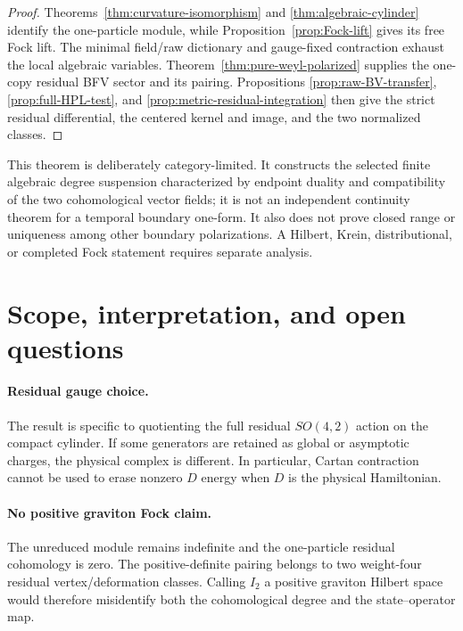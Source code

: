 \documentclass[11pt]{article}
\theoremstyle{definition}
\theoremstyle{remark}
\begin{document}
\begin{proof}
Theorems~\ref{thm:curvature-isomorphism} and
\ref{thm:algebraic-cylinder} identify the one-particle module, while
Proposition~\ref{prop:Fock-lift} gives its free Fock lift.  The minimal
field/raw dictionary and gauge-fixed contraction exhaust the local algebraic
variables.  Theorem~\ref{thm:pure-weyl-polarized} supplies the one-copy
residual BFV sector and its pairing.  Propositions
\ref{prop:raw-BV-transfer}, \ref{prop:full-HPL-test}, and
\ref{prop:metric-residual-integration} then give the strict residual
differential, the centered kernel and image, and the two normalized classes.
\end{proof}

This theorem is deliberately category-limited.  It constructs the selected
finite algebraic degree suspension characterized by endpoint duality and
compatibility of the two cohomological vector fields; it is not an
independent continuity theorem for a temporal boundary one-form.  It also
does not prove closed range or uniqueness among other boundary
polarizations.  A Hilbert, Krein, distributional, or completed Fock
statement requires separate analysis.

\section{Scope, interpretation, and open questions}\label{sec:scope}

\paragraph{Residual gauge choice.}
The result is specific to quotienting the full residual $SO(4,2)$ action on
the compact cylinder.  If some generators are retained as global or
asymptotic charges, the physical complex is different.  In particular,
Cartan contraction cannot be used to erase nonzero $D$ energy when $D$ is
the physical Hamiltonian.

\paragraph{No positive graviton Fock claim.}
The unreduced module remains indefinite and the one-particle residual
cohomology is zero.  The positive-definite pairing belongs to two
weight-four residual vertex/deformation classes.
Calling $I_2$ a positive graviton Hilbert space would therefore misidentify
both the cohomological degree and the state--operator map.
\end{document}
